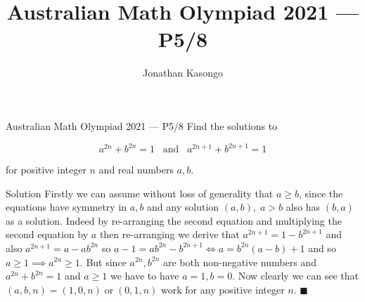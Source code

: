 \documentclass{article}
\author{Jonathan Kasongo}
\title{Australian Math Olympiad 2021 --- P5/8}
\begin{document}
\maketitle

\begin{problem}{Australian Math Olympiad 2021 --- P5/8}
Find the solutions to

$$
a^{2n} + b^{2n} = 1 \; \; \; \text{and} \; \; \; a^{2n+1} + b^{2n+1} = 1
$$

for positive integer $n$ and real numbers $a, b$.
\end{problem}

\begin{solution}{Solution}
Firstly we can assume without loss of generality that $a \geq b$, since
the equations have symmetry in $a, b$ and any solution $(a,b),\; a>b$ also
has $(b,a)$ as a solution. Indeed by re-arranging the second equation and multiplying the second equation by $a$ then re-arranging we derive that
$a^{2n+1} = 1 - b^{2n+1}$ and also $a^{2n+1} = a - ab^{2n}$
so $a-1 = ab^{2n} - b^{2n+1} \iff a = b^{2n} (a-b) + 1$ and so
$a \geq 1 \implies a^{2n} \geq 1$.
But since $a^{2n}, b^{2n}$ are both non-negative numbers and
$a^{2n} + b^{2n} = 1$ and $a\geq 1$ we have to have $a = 1, b = 0$. Now
clearly we can see that $(a,b,n) = (1, 0, n) \; \text{or} \; (0, 1, n)$
work for any positive integer $n$. $\blacksquare$

\end{solution}
\end{document}
